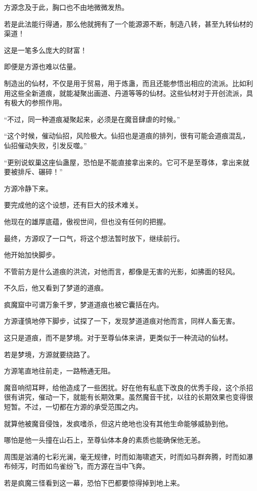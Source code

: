 \begin{this_body}
方源念及于此，胸口也不由地微微发热。

若是此法能行得通，那么他就拥有了一个能源源不断，制造八转，甚至九转仙材的渠道！

这是一笔多么庞大的财富！

即便是方源也难以估量。

制造出的仙材，不仅是用于贸易，用于炼蛊，而且还能参悟出相应的流派。比如利用这些全新道痕，就能凝聚出画道、丹道等等的仙材。这些仙材对于开创流派，具有极大的参照作用。

“不过，同一种道痕凝聚起来，必须是在魔音肆虐的时候。”

“这个时候，催动仙招，风险极大。仙招也是道痕的排列，很有可能会道痕混乱，仙招催动失败，引发反噬。”

“更别说蚁巢这座仙蛊屋，恐怕是不能直接拿出来的。它可不是至尊体，拿出来就要被排斥、碾碎！”

方源冷静下来。

要完成他的这个设想，还有巨大的技术难关。

他现在的雄厚底蕴，傲视世间，但也没有任何的把握。

最终，方源叹了一口气，将这个想法暂时放下，继续前行。

他开始加快脚步。

不管前方是什么道痕的洪流，对他而言，都像是无害的光影，如拂面的轻风。

不久后，他又看到了梦道的道痕。

疯魔窟中可谓万象千罗，梦道道痕也被它囊括在内。

方源谨慎地停下脚步，试探了一下，发现梦道道痕对他而言，同样人畜无害。

这只是道痕，而不是梦境。对于至尊仙体来讲，更类似于一种流动的仙材。

若是梦境，方源就要绕路了。

方源笔直地往前走，一路畅通无阻。

魔音响彻耳畔，给他造成了一些困扰。好在他有私底下改良的优秀手段，这个杀招很有讲究，催动一下，就能有长期效果。虽然魔音干扰，以往的长期效果也变得很短暂。不过，一切都在方源的承受范围之内。

就算他被魔音侵蚀，发疯嗜杀，但这片绝地也没有其他生命能够威胁到他。

哪怕是他一头撞在山石上，至尊仙体本身的素质也能确保他无恙。

周围是汹涌的七彩光澜，毫无规律，时而如海啸遮天，时而如马群奔腾，时而如瀑布倾泻，时而如鸟雀纷飞，而方源在当中飞奔。

若是疯魔三怪看到这一幕，恐怕下巴都要惊得掉到地上来。


\end{this_body}
